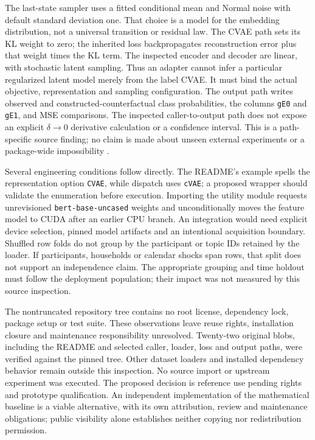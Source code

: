The last-state sampler uses a fitted conditional mean and Normal noise
with default standard deviation one. That choice is a model for the
embedding distribution, not a universal transition or residual law.
The CVAE path sets its KL weight to zero; the inherited loss
backpropagates reconstruction error plus that weight times the KL term.
The inspected encoder and decoder are linear, with stochastic latent
sampling. Thus an adapter cannot infer a particular regularized latent
model merely from the label CVAE. It must bind the actual objective,
representation and sampling configuration.
The output path writes observed and constructed-counterfactual class
probabilities, the columns \texttt{gE0} and \texttt{gE1}, and MSE
comparisons. The inspected caller-to-output path does not expose an
explicit $\delta\to0$ derivative calculation or a confidence interval.
This is a path-specific source finding; no claim is made about unseen
external experiments or a package-wide impossibility
\citep{exec16_longpolicy_code}.

Several engineering conditions follow directly. The README's example
spells the representation option \texttt{CVAE}, while dispatch uses
\texttt{cVAE}; a proposed wrapper should validate the enumeration before
execution. Importing the utility module requests unrevisioned
\texttt{bert-base-uncased} weights and unconditionally moves the feature
model to CUDA after an earlier CPU branch.
An integration would need explicit device selection, pinned model
artifacts and an intentional acquisition boundary.
Shuffled row folds do not group by the participant or topic IDs retained
by the loader. If participants, households or calendar shocks span rows,
that split does not support an independence claim.
The appropriate grouping and time holdout must follow the deployment
population; their impact was not measured by this source inspection.

The nontruncated repository tree contains no root license, dependency
lock, package setup or test suite. These observations leave reuse rights,
installation closure and maintenance responsibility unresolved.
Twenty-two original blobs, including the README and selected caller,
loader, loss and output paths, were verified against the pinned tree.
Other dataset loaders and installed dependency behavior remain outside
this inspection. No source import or upstream experiment was executed.
The proposed decision is reference use pending rights and prototype
qualification. An independent implementation of the mathematical
baseline is a viable alternative, with its own attribution, review and
maintenance obligations; public visibility alone establishes neither
copying nor redistribution permission.


